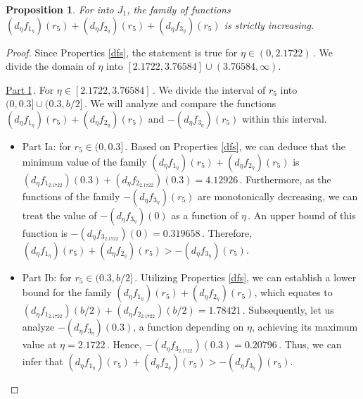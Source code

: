 \documentclass[final,11pt]{article}
\numberwithin{equation}{section}
\newtheorem{proposition}[theorem]{Proposition}
\theoremstyle{definition}
\begin{document}
\begin{proposition}\label{otraaux}
For into $J_{1}$, the family of functions $(d_{\eta}f_{1_{\eta}})(r_{5})+(d_{\eta}f_{2_{\eta}})(r_{5})+(d_{\eta}f_{3_{\eta}})(r_{5})$ is strictly increasing.
\end{proposition}
\begin{proof}
Since Properties \ref{dfs}, the statement is true for $\eta\in(0,2.1722)$\,. We divide the domain of $\eta$ into $[2.1722, 3.76584]\cup (3.76584,\infty)$.

\underline{Part I}\,. For $\eta\in[2.1722, 3.76584]$\,. We divide the interval of $r_{5}$ into $(0,0.3] \cup (0.3,b/2]$\,. We will analyze and compare the functions $\left(d_{\eta}f_{1_{\eta}}\right)(r_{5}) + \left(d_{\eta}f_{2_{\eta}}\right)(r_{5})$ and $-\left(d_{\eta}f_{3_{\eta}}\right)(r_{5})$ within this interval.

\begin{itemize}
\item Part Ia: for \(r_{5} \in (0, 0.3]\)\,. Based on Properties \ref{dfs}, we can deduce that the minimum value of the family $\left(d_{\eta} f_{1_{\eta}}\right)(r_{5}) + \left(d_{\eta} f_{2_{\eta}}\right)(r_{5})$ is $\left(d_{\eta} f_{1_{2.1722}}\right)(0.3) + \left(d_{\eta} f_{2_{2.1722}}\right)(0.3) = 4.12926$\,. Furthermore, as the functions of the family $-\left(d_{\eta} f_{3_{\eta}}\right)(r_{5})$ are monotonically decreasing, we can treat the value of $-\left(d_{\eta} f_{3_{\eta}}\right)(0)    $ as a function of $\eta$\,. An upper bound of this function is $-\left(d_{\eta} f_{3_{2.1722}}\right)(0)=0.319658$\,. Therefore, $\left(d_{\eta} f_{1_{\eta}}\right)(r_{5}) + \left(d_{\eta} f_{2_{\eta}}\right)(r_{5})>- \left(d_{\eta} f_{3_{\eta}}\right)(r_{5})$.

\item Part Ib: for $r_{5}\in (0.3,b/2]$\,. Utilizing Properties \ref{dfs}, we can establish a lower bound for the family $\left(d_{\eta}f_{1_{\eta}}\right)(r_{5}) + \left(d_{\eta}f_{2_{\eta}}\right)(r_{5})$, which equates to $\left( d_{\eta}f_{1_{2.1722}}\right)(b/2) + \left(d_{\eta}f_{2_{2.1722}}\right)(b/2)=1.78421$\,. Subsequently, let us analyze $-\left(d_{\eta}f_{3_{\eta}}\right)(0.3)$, a function depending on $\eta$, achieving its maximum value at $\eta=2.1722$\,. Hence, $-\left(d_{\eta}f_{3_{2.1722}}\right)(0.3)=0.20796$\,. Thus, we can infer that $\left(d_{\eta} f_{1_{\eta}}\right)(r_{5}) + \left(d_{\eta} f_{2_{\eta}}\right)(r_{5}) > -\left(d_{\eta} f_{3_{\eta}}\right)(r_{5})$.
\end{itemize}


\end{proof}
\end{document}
